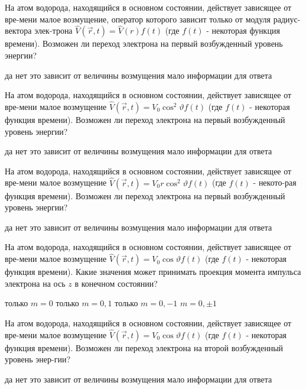 \documentclass[11pt,a4paper]{exam}
\begin{document}
\begin{questions}
\question На атом водорода, находящийся в основном состоянии, действует зависящее от вре-мени малое возмущение, оператор которого зависит только от модуля радиус-вектора элек-трона $\hat V(\vec r,t) = \hat V(r)f(t)$ (где $f(t)$ - некоторая функция времени). Возможен ли переход электрона на первый возбужденный уровень энергии? 
\begin{choices}
\choice да
\choice нет
\choice это зависит от величины возмущения
\choice мало информации для ответа
\end{choices}

\question На атом водорода, находящийся в основном состоянии, действует зависящее от вре-мени малое возмущение $\hat V(\vec r,t) = {V_0}{\cos ^2}\vartheta f(t)$ (где $f(t)$ - некоторая функция времени). Возможен ли переход электрона на первый возбужденный уровень энергии? 
\begin{choices}
\choice да
\choice нет
\choice это зависит от величины возмущения
\choice мало информации для ответа
\end{choices}

\question На атом водорода, находящийся в основном состоянии, действует зависящее от вре-мени малое возмущение $\hat V(\vec r,t) = {V_0}r{\cos ^2}\vartheta f(t)$ (где $f(t)$ - некото-рая функция времени). Возможен ли переход электрона на первый возбужденный уровень энергии? 
\begin{choices}
\choice да
\choice нет
\choice это зависит от величины возмущения
\choice мало информации для ответа
\end{choices}

\question На атом водорода, находящийся в основном состоянии, действует зависящее от вре-мени малое возмущение $\hat V(\vec r,t) = {V_0}\cos \vartheta f(t)$ (где $f(t)$ - некоторая функция времени). Какие значения может принимать проекция момента импульса электрона на ось $z$ в конечном состоянии? 
\begin{choices}
\choice только $m = 0$    
\choice только $m = 0,1$
\choice только $m = 0, - 1$     
\choice $m = 0, \pm 1$
\end{choices}

\question На атом водорода, находящийся в основном состоянии, действует зависящее от вре-мени малое возмущение $\hat V(\vec r,t) = {V_0}\cos \vartheta f(t)$ (где $f(t)$ - некоторая функция времени). Возможен ли переход электрона на второй возбужденный уровень энер-гии? 
\begin{choices}
\choice да
\choice нет
\choice это зависит от величины возмущения
\choice мало информации для ответа
\end{choices}


\end{questions}
\end{document}
